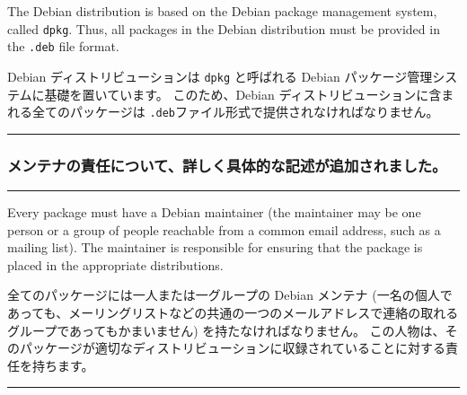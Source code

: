 \documentclass[mingoth,a4paper]{jsarticle}
\begin{document}
\par
\parbox{0.48\linewidth}{
	  The Debian distribution is based on the Debian
	  package management system, called {\tt dpkg}. Thus,
	  all packages in the Debian distribution must be provided
	  in the {\tt .deb} file format.
}\hfil 
\parbox{0.48\linewidth}{
	  Debian ディストリビューションは {\tt dpkg}
	  と呼ばれる Debian パッケージ管理システムに基礎を置いています。
	  このため、Debian ディストリビューションに含まれる全てのパッケージは
	   {\tt .deb}ファイル形式で提供されなければなりません。
}
\hrule
\vspace{1ex}

\subsubsection{メンテナの責任について、詳しく具体的な記述が追加されました。}
\vspace{1ex}
\hrule
{}\par
\parbox[t]{0.46\linewidth}{
	    Every package must have a Debian maintainer (the
	    maintainer may be one person or a group of people
	    reachable from a common email address, such as a mailing
	    list).  The maintainer is responsible for ensuring that
	    the package is placed in the appropriate distributions.
}\hfil 
\parbox[t]{0.46\linewidth}{
	    全てのパッケージには一人または一グループの Debian メンテナ
	    (一名の個人であっても、メーリングリストなどの共通の一つのメールアドレスで連絡の取れるグループであってもかまいません) 
	    を持たなければなりません。
	    この人物は、そのパッケージが適切なディストリビューションに収録されていることに対する責任を持ちます。
}
\hrule
\end{document}
